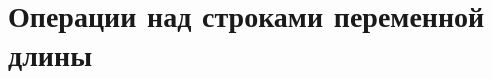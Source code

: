 \documentclass[discrete.tex]{subfiles}
\begin{document}
\section{Операции над строками переменной длины}
\end{document}
